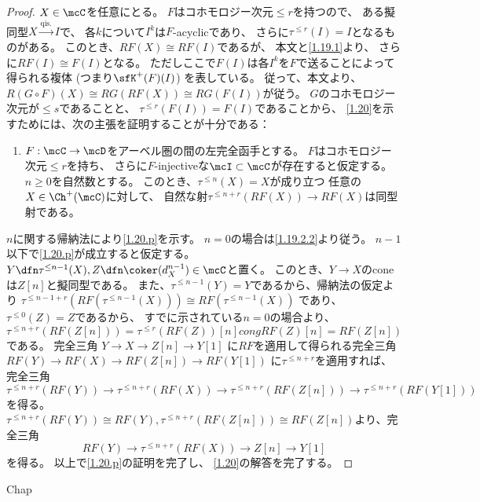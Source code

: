 \documentclass[uplatex,dvipdfmx]{jsarticle}
\begin{document}
\begin{proof}
  \(X\in \mcC\)を任意にとる。
  \(F\)はコホモロジー次元\(\leq r\)を持つので、
  ある擬同型\(X\xrightarrow{\text{qis.}} I\)で、
  各\(k\)について\(I^k\)は\(F\)-acyclicであり、
  さらに\(\tau^{\leq r}(I) = I\)となるものがある。
  このとき、\(RF(X) \cong RF(I)\)であるが、
  本文\cite[Proposition 1.8.3]{kashiwara2002sheaves}と\autoref{1.19.1}より、
  さらに\(RF(I)\cong F(I)\)となる。
  ただしここで\(F(I)\)は各\(I^k\)を\(F\)で送ることによって得られる複体
  (つまり\(\sfK^+(F)(I)\)) を表している。
  従って、本文\cite[Proposition 1.8.7]{kashiwara2002sheaves}より、
  \(R(G\circ F)(X)\cong RG(RF(X)) \cong RG(F(I))\)が従う。
  \(G\)のコホモロジー次元が\(\leq s\)であることと、
  \(\tau^{\leq r}(F(I)) = F(I)\)であることから、
  \autoref{1.20}を示すためには、次の主張を証明することが十分である：
  \begin{enumerate}[label=(\fnsymbol*),start=2]
    \item \label{1.20.p}
    \(F:\mcC\to \mcD\)をアーベル圏の間の左完全函手とする。
    \(F\)はコホモロジー次元\(\leq r\)を持ち、
    さらに\(F\)-injectiveな\(\mcI\subset \mcC\)が存在すると仮定する。
    \(n\geq 0\)を自然数とする。
    このとき、\(\tau^{\leq n}(X) = X\)が成り立つ
    任意の\(X\in \Ch^+(\mcC)\)に対して、
    自然な射\(\tau^{\leq n+r}(RF(X)) \to RF(X)\)は同型射である。
  \end{enumerate}
  \(n\)に関する帰納法により\ref{1.20.p}を示す。
  \(n=0\)の場合は\autoref{1.19.2.2}より従う。
  \(n-1\)以下で\ref{1.20.p}が成立すると仮定する。
  \(Y\dfn \tau^{\leq n-1}(X), Z\dfn \coker(d_X^{n-1})\in \mcC\)と置く。
  このとき、\(Y\to X\)のconeは\(Z[n]\)と擬同型である。
  また、\(\tau^{\leq n-1}(Y)=Y\)であるから、帰納法の仮定より
  \(\tau^{\leq n-1+r}(RF(\tau^{\leq n-1}(X))) \cong RF(\tau^{\leq n-1}(X))\)
  であり、
  \(\tau^{\leq 0}(Z) = Z\)であるから、
  すでに示されている\(n=0\)の場合より、
  \(\tau^{\leq n+r}(RF(Z[n])) = \tau^{\leq r}(RF(Z))[n]
  cong RF(Z)[n] = RF(Z[n])\)である。
  完全三角
  \(Y\to X \to Z[n] \to Y[1]\)
  に\(RF\)を適用して得られる完全三角
  \(RF(Y) \to RF(X) \to RF(Z[n]) \to RF(Y[1])\)
  に\(\tau^{\leq n+r}\)を適用すれば、
  完全三角
  \[
  \tau^{\leq n+r}(RF(Y)) \to \tau^{\leq n+r}(RF(X)) \to
  \tau^{\leq n+r}(RF(Z[n])) \to \tau^{\leq n+r}(RF(Y[1]))
  \]
  を得る。
  \(\tau^{\leq n+r}(RF(Y)) \cong RF(Y),
  \tau^{\leq n+r}(RF(Z[n])) \cong RF(Z[n])\)より、完全三角
  \[
  RF(Y) \to \tau^{\leq n+r}(RF(X)) \to Z[n] \to Y[1]
  \]
  を得る。
  以上で\ref{1.20.p}の証明を完了し、
  \autoref{1.20}の解答を完了する。
\end{proof}



\ifcsname Chap\endcsname\else
\printbibliography
\end{document}
